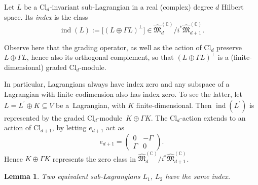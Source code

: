 \documentclass[pdftex]{sigma}
\numberwithin{equation}{section}
\newtheorem{Lemma}[Theorem]{Lemma}
\newcommand{\C}{\mathbb{C}}
\newcommand{\ind}{\operatorname{ind}}
\newcommand{\Cl}{\mathrm{Cl}}
\begin{document}
\begin{Definition}
Let $L$ be a $\Cl_d$-invariant sub-Lagrangian in a real (complex) degree $d$ Hilbert space.
Its \emph{index} is the class
\begin{equation*}
 \ind(L) := \big[(L \oplus \Gamma L)^\perp\big] \in \hat{\mathfrak{M}}_d^{(\C)} / i^* \hat{\mathfrak{M}}_{d+1}^{(\C)}.
\end{equation*}
\end{Definition}

Observe here that the grading operator, as well as the action of $\Cl_d$ preserve $L \oplus \Gamma L$, hence also its orthogonal complement, so that $(L \oplus \Gamma L)^\perp$ is a (finite-dimensional) graded $\Cl_d$-module.


\begin{Example}
In particular, Lagrangians always have index zero and any subspace of a Lagrangian with finite codimension also has index zero.
To see the latter, let $L = L^\prime \oplus K \subseteq V$ be a~Lagrangian, with $K$ finite-dimensional.
Then $\ind(L^\prime)$ is represented by the graded $\Cl_d$-module~${K \oplus \Gamma K}$.
The $\Cl_d$-action extends to an action of $\Cl_{d+1}$, by letting $e_{d+1}$ act as
\begin{equation*}
 e_{d+1} = \begin{pmatrix} 0 & -\Gamma \\ \Gamma & 0 \end{pmatrix}.
\end{equation*}
Hence $K \oplus \Gamma K$ represents the zero class in $\hat{\mathfrak{M}}_d^{(\C)} / i^* \hat{\mathfrak{M}}_{d+1}^{(\C)}$.
\end{Example}

\begin{Lemma}
Two equivalent sub-Lagrangians $L_1$, $L_2$ have the same index.
\end{Lemma}
\end{document}
